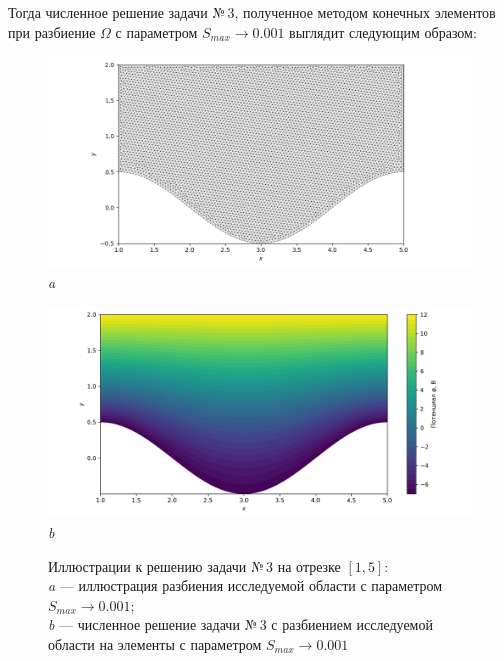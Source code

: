 \documentclass[12pt, a4paper]{article}
\begin{document}
			Тогда численное решение задачи №\,3, полученное методом конечных элементов при разбиение $\Omega$ с параметром $S_{max} \rightarrow 0.001$ выглядит следующим образом: 
			\vspace*{5mm}
			\begin{figure}[h]       
					{ 
						\begin{minipage}{0.47\textwidth} 
							\centering 
							\hspace*{-28.5mm}
							\includegraphics[width=1.5\columnwidth]{Test_domain_1_1_sin_mesh_0001_calfem_net_1.png}\\
							\hspace*{-18.5mm}
							\textit{a}
							
						\end{minipage}                                 
					} 
					{ 
						\begin{minipage}{0.47\textwidth} 
							\centering 
							\hspace*{-11.mm}
							\includegraphics[width=1.5\columnwidth]{Test_domain_1_1_sin_mesh_0001_calfem.png}\\
							\hspace*{7.mm}
							\textit{b}						
						\end{minipage}                                 
					} 
					
				
				\vspace*{5mm}
				\caption{Иллюстрации к решению задачи №\,3 на отрезке $\left[ 1, 5 \right]$:\\
					\textit{a} --- иллюстрация разбиения исследуемой области с параметром $S_{max} \rightarrow 0.001$; \\
					\textit{b} --- численное решение задачи №\,3 с разбиением исследуемой области на  элементы с параметром $S_{max} \rightarrow 0.001$ \\
				} 
			\end{figure}
			
\end{document}
